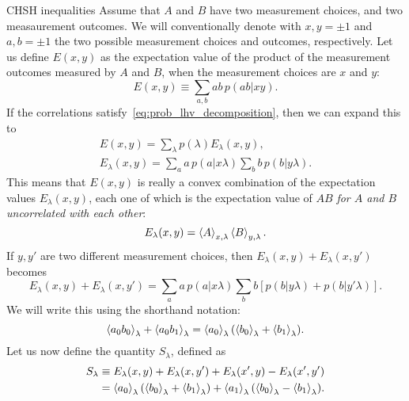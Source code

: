 \documentclass[12pt]{report}
\begin{document}
\begin{depthbox}[]{CHSH inequalities}
    Assume that $A$ and $B$ have two measurement choices, and two measaurement outcomes. We will conventionally denote with $x,y=\pm1$ and $a,b=\pm1$ the two possible measurement choices and outcomes, respectively.
    Let us define $E(x,y)$ as the expectation value of the product of the measurement outcomes measured by $A$ and $B$, when the measurement choices are $x$ and $y$:
    \begin{equation}
        E(x,y) \equiv \sum_{a,b} ab \, p(ab|xy).
    \end{equation}
    If the correlations satisfy~\cref{eq:prob_lhv_decomposition}, then we can expand this to
    \begin{equation}
    \begin{gathered}
        E(x,y) = \sum_\lambda p(\lambda) E_\lambda(x,y), \\
        E_\lambda(x,y) = \sum_a a\,p(a|x\lambda)\sum_b b\,p(b|y\lambda).
    \end{gathered}
    \end{equation}
    This means that $E(x,y)$ is really a convex combination of the expectation values $E_\lambda(x, y)$, each one of which is the expectation value of $AB$ \emph{for $A$ and $B$ uncorrelated with each other}:
    \begin{equation}
        E_\lambda(x,y) = \expval{A}_{x,\lambda} \expval{B}_{y,\lambda}.
    \end{equation}
    If $y,y'$ are two different measurement choices, then $E_\lambda(x,y)+E_\lambda(x,y')$ becomes
    \begin{equation}
        E_\lambda(x,y) + E_\lambda(x,y') =
        \sum_a a\,p(a|x\lambda) \sum_b b[p(b|y\lambda) + p(b|y'\lambda)].
    \end{equation}
    We will write this using the shorthand notation:
    \begin{equation}
        \expval{a_0 b_0}_\lambda + \expval{a_0 b_1}_\lambda =
        \expval{a_0}_\lambda (\expval{b_0}_\lambda + \expval{b_1}_\lambda).
    \end{equation}
    Let us now define the quantity $S_\lambda$, defined as
    \begin{equation}
    \begin{aligned}
        S_\lambda &\equiv
            E_\lambda(x,y) + E_\lambda(x,y') + E_\lambda(x',y) - E_\lambda(x',y') \\
        &= \expval{a_0}_\lambda (\expval{b_0}_\lambda + \expval{b_1}_\lambda)
        + \expval{a_1}_\lambda (\expval{b_0}_\lambda - \expval{b_1}_\lambda).

\end{aligned}
\end{equation}
\end{depthbox}
\end{document}

